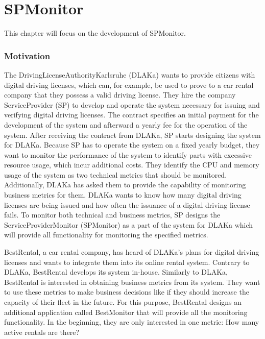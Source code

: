 \chapter{SPMonitor}




This chapter will focus on the development of SPMonitor.

\subsection{Motivation}
The DrivingLicenseAuthorityKarlsruhe (DLAKa) wants to provide citizens with digital driving licenses,
which can, for example, be used to prove to a car rental company that they possess a valid driving license.
They hire the company ServiceProvider (SP) to develop and operate the system necessary for issuing and verifying
digital driving licenses. The contract specifies an initial payment for the development of the system
and afterward a yearly fee for the operation of the system.
After receiving the contract from DLAKa, SP starts designing the system
for DLAKa. Because SP has to operate the system on a fixed yearly budget,
they want to monitor the performance of the system to identify parts with excessive resource usage, which
incur additional costs. They identify the CPU and memory usage of the system as two technical metrics that should be monitored.
Additionally, DLAKa has asked them to provide the capability of monitoring business metrics for them.
DLAKa wants to know how many digital driving licenses are being issued and how often the issuance of a digital
driving license fails. To monitor both technical and business metrics, SP designs the ServiceProviderMonitor (SPMonitor) as a part
of the system for DLAKa which will provide all functionality for monitoring the specified metrics.

BestRental, a car rental company, has heard of DLAKa's plans for digital driving licenses
and wants to integrate them into its online rental system. Contrary to DLAKa, BestRental develops its
system in-house. Similarly to DLAKa, BestRental is interested in obtaining business metrics from its system.
They want to use these metrics to make business decisions like if they should increase the capacity of their fleet in the future.
For this purpose, BestRental designs an additional application called BestMonitor that will provide all the monitoring functionality.
In the beginning, they are only interested in one metric: How many active rentals are there?

